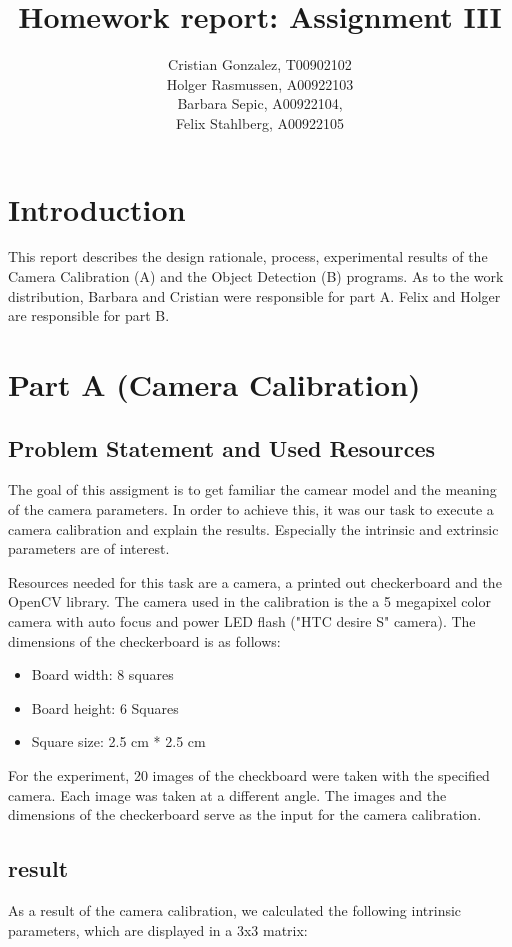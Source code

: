 \documentclass[letter,12pt]{article}
\begin{document}
\title{Homework report: Assignment III}
\author{Cristian Gonzalez, T00902102\\
Holger Rasmussen, A00922103\\
Barbara Sepic, A00922104,\\
Felix Stahlberg, A00922105
}
\maketitle
\section{Introduction}
This report describes the design rationale, process, experimental results of the Camera Calibration (A) and the Object Detection (B) programs.   As to the work distribution, Barbara and Cristian were responsible for part A.  Felix and Holger are responsible for part B.  
\section{Part A (Camera Calibration)}
\subsection{Problem Statement and Used Resources}
The goal of this assigment is to get familiar the camear model and the meaning of the camera parameters.  In order to achieve this, it was our task to execute a camera calibration and explain the results.  Especially the intrinsic and extrinsic parameters are of interest. 

Resources needed for this task are a camera, a printed out checkerboard and the OpenCV library.  The camera used in the calibration is the a 5 megapixel color camera with auto focus and power LED flash ("HTC desire S" camera).  The dimensions of the checkerboard is as follows:
\begin{itemize}
	\item Board width: 8 squares
	\item Board height: 6 Squares
	\item Square size: 2.5 cm * 2.5 cm
\end{itemize}

For the experiment, 20 images of the checkboard were taken with the specified camera.  Each image was taken at a different angle.  The images and the dimensions of the checkerboard serve as the input for the camera calibration.
\subsection{result}
As a result of the camera calibration, we calculated the following intrinsic parameters, which are displayed in a 3x3 matrix:
\end{document}
